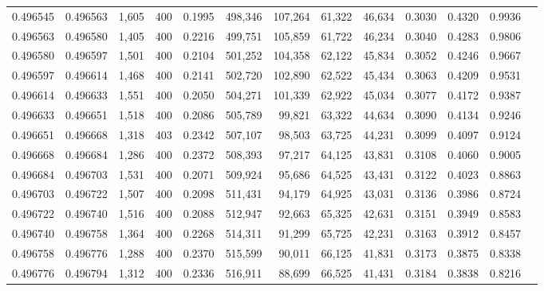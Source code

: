 \begin{tabular}{rrrrrrrrrrrrr}
0.496545 & 0.496563 &  1,605 & 400 &                                     0.1995 & 498,346 & 107,264 &  61,322 &  46,634 & 0.3030 & 0.4320 & 0.9936 \\
0.496563 & 0.496580 &  1,405 & 400 &                                     0.2216 & 499,751 & 105,859 &  61,722 &  46,234 & 0.3040 & 0.4283 & 0.9806 \\
0.496580 & 0.496597 &  1,501 & 400 &                                     0.2104 & 501,252 & 104,358 &  62,122 &  45,834 & 0.3052 & 0.4246 & 0.9667 \\
0.496597 & 0.496614 &  1,468 & 400 &                                     0.2141 & 502,720 & 102,890 &  62,522 &  45,434 & 0.3063 & 0.4209 & 0.9531 \\
0.496614 & 0.496633 &  1,551 & 400 &                                     0.2050 & 504,271 & 101,339 &  62,922 &  45,034 & 0.3077 & 0.4172 & 0.9387 \\
0.496633 & 0.496651 &  1,518 & 400 &                                     0.2086 & 505,789 &  99,821 &  63,322 &  44,634 & 0.3090 & 0.4134 & 0.9246 \\
0.496651 & 0.496668 &  1,318 & 403 &                                     0.2342 & 507,107 &  98,503 &  63,725 &  44,231 & 0.3099 & 0.4097 & 0.9124 \\
0.496668 & 0.496684 &  1,286 & 400 &                                     0.2372 & 508,393 &  97,217 &  64,125 &  43,831 & 0.3108 & 0.4060 & 0.9005 \\
0.496684 & 0.496703 &  1,531 & 400 &                                     0.2071 & 509,924 &  95,686 &  64,525 &  43,431 & 0.3122 & 0.4023 & 0.8863 \\
0.496703 & 0.496722 &  1,507 & 400 &                                     0.2098 & 511,431 &  94,179 &  64,925 &  43,031 & 0.3136 & 0.3986 & 0.8724 \\
0.496722 & 0.496740 &  1,516 & 400 &                                     0.2088 & 512,947 &  92,663 &  65,325 &  42,631 & 0.3151 & 0.3949 & 0.8583 \\
0.496740 & 0.496758 &  1,364 & 400 &                                     0.2268 & 514,311 &  91,299 &  65,725 &  42,231 & 0.3163 & 0.3912 & 0.8457 \\
0.496758 & 0.496776 &  1,288 & 400 &                                     0.2370 & 515,599 &  90,011 &  66,125 &  41,831 & 0.3173 & 0.3875 & 0.8338 \\
0.496776 & 0.496794 &  1,312 & 400 &                                     0.2336 & 516,911 &  88,699 &  66,525 &  41,431 & 0.3184 & 0.3838 & 0.8216 \\

\end{tabular}
